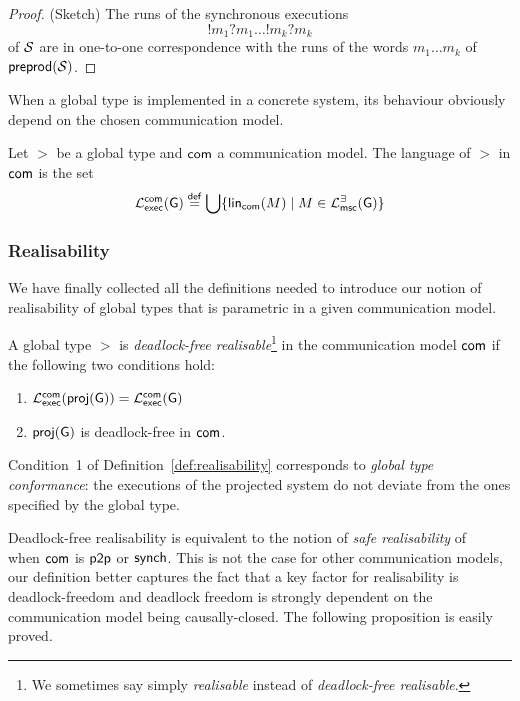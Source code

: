 \begin{proof}(Sketch)
    The runs of the synchronous executions $$!m_1?m_1\ldots!m_k?m_k$$ of $\mathcal{S}$ are in one-to-one correspondence with the 
    runs of the words $m_1\ldots m_k$ of $\mathsf{preprod}(\mathcal{S})$.
\end{proof}

When a global type is implemented in a concrete system, its behaviour obviously depend on the chosen communication model. 

\begin{definition}\label{def:global-type-language}
    Let $\gt$ be a global type and $\mathsf{com}$ a communication model. 
    The language of $\gt$ in $\mathsf{com}$ is the set
    $$
    \mathcal{L}_{\mathsf{exec}}^{\mathsf{com}}(\mathsf{G})\stackrel{\mathsf{def}}{=}
    \bigcup\{\mathsf{lin}_{\mathsf{com}}(M)\mid M\in\mathcal{L}_{\mathsf{msc}}^{\exists}(\mathsf{G})\}
    $$
\end{definition}


\subsubsection*{Realisability}\label{sec:realisability}

We have finally  collected all the definitions needed to introduce our notion of realisability
of global types that is parametric in a given communication model.
\begin{definition}\label{def:realisability}
    A global type $\gt$ is \emph{deadlock-free realisable}\footnote{We sometimes say simply \emph{realisable} instead of \emph{deadlock-free realisable}.}
    in the communication model
    $\mathsf{com}$
    if the following two conditions hold:
    \begin{enumerate}
    \item $\mathcal{L}_{\mathsf{exec}}^{\mathsf{com}}(\mathsf{proj}(\mathsf{G})) = 
                \mathcal{L}_{\mathsf{exec}}^{\mathsf{com}}(\mathsf{G})$
    \item $\mathsf{proj}(\mathsf{G})$ is deadlock-free in $\mathsf{com}$.
    \end{enumerate}
\end{definition}

Condition~1 of Definition~\ref{def:realisability} corresponds to  \emph{global type conformance}: the executions of the projected system do not 
deviate from the ones specified by the global type.


Deadlock-free realisability is equivalent to the notion of 
\emph{safe realisability} of ~\cite{DBLP:journals/tcs/AlurEY05} 
when $\mathsf{com}$ is $\mathsf{p2p}$ or $\mathsf{synch}$.
This is not the case for other communication models, our definition better captures the fact that a key factor for 
realisability is deadlock-freedom and deadlock freedom is strongly dependent on the communication model being causally-closed. The following proposition is easily proved.


